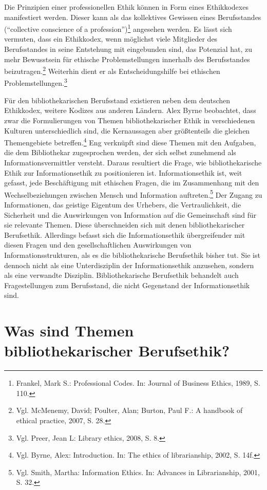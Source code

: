 \documentclass[output=paper]{langscibook}
\begin{document}
Die Prinzipien einer professionellen Ethik können in Form eines
Ethikkodexes manifestiert werden. Dieser kann als das kollektives
Gewissen eines Berufsstandes (\enquote{collective conscience of a
profession})\footnote{Frankel, Mark S.: Professional Codes. In: Journal
  of Business Ethics, 1989, S. 110.} angesehen werden. Es lässt sich
vermuten, dass ein Ethikkodex, wenn möglichst viele Mitglieder des
Berufsstandes in seine Entstehung mit eingebunden sind, das Potenzial
hat, zu mehr Bewusstsein für ethische Problemstellungen innerhalb des
Berufsstandes beizutragen.\footnote{Vgl. McMenemy, David; Poulter, Alan;
  Burton, Paul F.: A handbook of ethical practice, 2007, S. 28.}
Weiterhin dient er als Entscheidungshilfe bei ethischen
Problemstellungen.\footnote{Vgl. Preer, Jean L: Library ethics, 2008, S.
  8.}

Für den bibliothekarischen Berufsstand existieren neben dem deutschen
Ethikkodex, weitere Kodizes aus anderen Ländern. Alex Byrne beobachtet,
dass zwar die Formulierungen von Themen bibliothekarischer Ethik in
verschiedenen Kulturen unterschiedlich sind, die Kernaussagen aber
größtenteils die gleichen Themengebiete betreffen.\footnote{Vgl. Byrne,
  Alex: Introduction. In: The ethics of librarianship, 2002, S. 14f.}
Eng verknüpft sind diese Themen mit den Aufgaben, die dem Bibliothekar
zugesprochen werden, der sich selbst zunehmend als
Informationsvermittler versteht. Daraus resultiert die Frage, wie
bibliothekarische Ethik zur Informationsethik zu positionieren ist.
Informationsethik ist, weit gefasst, jede Beschäftigung mit ethischen
Fragen, die im Zusammenhang mit den Wechselbeziehungen zwischen Mensch
und Information auftreten.\footnote{Vgl. Smith, Martha: Information
  Ethics. In: Advances in Librarianship, 2001, S. 32.} Der Zugang zu
Informationen, das geistige Eigentum des Urhebers, die Vertraulichkeit,
die Sicherheit und die Auswirkungen von Information auf die Gemeinschaft
sind für sie relevante Themen. Diese überschneiden sich mit denen
bibliothekarischer Berufsethik. Allerdings befasst sich die
Informationsethik übergreifender mit diesen Fragen und den
gesellschaftlichen Auswirkungen von Informationsstrukturen, als es die
bibliothekarische Berufsethik bisher tut. Sie ist dennoch nicht als eine
Unterdisziplin der Informationsethik anzusehen, sondern als eine
verwandte Disziplin. Bibliothekarische Berufsethik behandelt auch
Fragestellungen zum Berufsstand, die nicht Gegenstand der
Informationsethik sind.

\hypertarget{was-sind-themen-bibliothekarischer-berufsethik}{%
\section*{Was sind Themen bibliothekarischer
Berufsethik?}\label{was-sind-themen-bibliothekarischer-berufsethik}}
\end{document}
